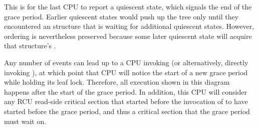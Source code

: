 \begin{center}
\end{center}

This is for the last CPU to report a quiescent state, which signals the
end of the grace period. Earlier quiescent states would push up the
 tree only until they encountered an  structure
that is waiting for additional quiescent states.
However, ordering is
nevertheless preserved because some later quiescent state will acquire
that  structure's .

Any number of events can lead up to a CPU invoking 
(or alternatively, directly invoking ), at which
point that CPU will notice the start of a new grace period while holding
its leaf  lock.
Therefore, all execution shown in this
diagram happens after the start of the grace period.
In addition, this
CPU will consider any RCU read-side critical section that started before
the invocation of  to have started before the
grace period, and thus a critical section that the grace period must
wait on.

